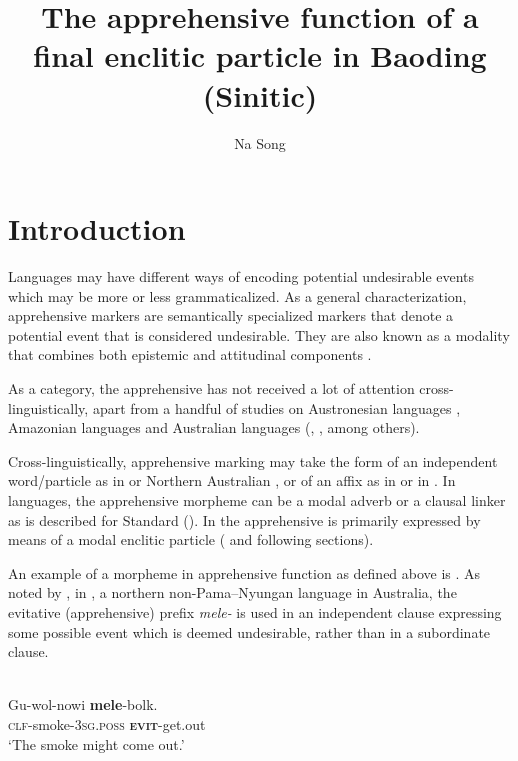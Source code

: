 \documentclass[output=paper,colorlinks,citecolor=brown, language=chinese]{langscibook}
\author{Na Song\orcid{}\affiliation{INALCO-CRLAO}}
\title{The apprehensive function of a final enclitic particle in Baoding (Sinitic)}
\begin{document}
\maketitle

\section{Introduction}

Languages may have different ways of encoding potential undesirable events which may be more or less grammaticalized. As a general characterization, apprehensive markers are semantically specialized markers that denote a potential event that is considered undesirable. They are also known as a modality that combines both epistemic and attitudinal components \citep[293]{lichtenberk1995}.

As a category, the apprehensive has not received a lot of attention cross-linguistically, apart from a handful of studies on Austronesian languages \citep{lichtenberk1995}, Amazonian languages \citep{vuillermet2018a} and Australian languages (\cite{Dixon2002}, \cite[255--296]{AngeloSchultze-Berndt2016}, \cite{Verstraete2005} among others).

Cross-linguistically, apprehensive marking may take the form of an independent word/particle as in  \citep{lichtenberk1995} or Northern Australian  \citep{AngeloSchultze-Berndt2016}, or of an affix as in  \citep[247]{Keen1983} or in  \citep{vuillermet2018a}. In  languages, the apprehensive morpheme can be a modal adverb or a clausal linker as is described for Standard  (). In  the apprehensive is primarily expressed by means of  a modal enclitic particle ( and following sections).

An example of a morpheme in apprehensive function as defined above is . As noted by \citet[102]{Merlan1983}, in , a northern non-Pama–Nyungan language in Australia, the evitative (apprehensive) prefix \textit{mele-} is used in an independent clause expressing some possible event which is deemed undesirable, rather than in a subordinate clause. 

\ea
\label{ex:Song1} 
 \\
\gll Gu-wol-nowi \textbf{mele}-bolk. \\
\textsc{clf}-smoke-\textsc{3sg.poss} \textbf{\textsc{evit}}-get.out \\
\glt `The smoke might come out.'
\z
\end{document}
